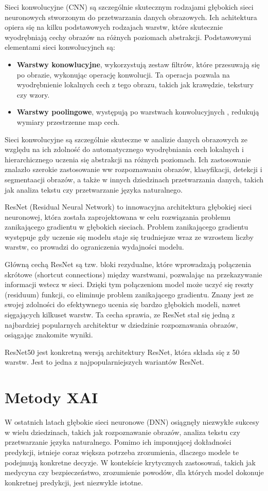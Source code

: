 Sieci konwolucyjne (CNN) są szczególnie skutecznym rodzajami głębokich sieci neuronowych stworzonym do przetwarzania danych obrazowych.
Ich achitektura opiera się na kilku podstawowych rodzajach warstw, które skutecznie wyodrębniają cechy obrazów na różnych poziomach abstrakcji.
Podstawowymi elementami sieci konwolucyjnch są:
\begin{itemize}
  \item \textbf{Warstwy konowlucyjne}, wykorzystują zestaw filtrów, które przesuwają się po obrazie, wykonując operację konwolucji.
    Ta operacja pozwala na wyodrębnienie lokalnych cech z tego obrazu, takich jak krawędzie, tekstury czy wzory.
  \item \textbf{Warstwy poolingowe}, występują po warstwach konwolucyjnych , redukują wymiary przestrzenne map cech.
\end{itemize}
Sieci konwolucyjne są szczególnie skuteczne w analizie danych obrazowych ze względu na ich zdolność do automatycznego wyodrębniania cech lokalnych i hierarchicznego uczenia się abstrakcji na różnych poziomach.
Ich zastosowanie znalazło szerokie zastosowanie ww rozpoznawaniu obrazów, klasyfikacji, detekcji i segmentaacji obrazów, a także w innych dziedzinach przetwarzania danych, takich jak analiza tekstu czy przetwarzanie języka naturalnego.

ResNet (Residual Neural Network) to innowacyjna architektura głębokiej sieci neuronowej, która została zaprojektowana w celu rozwiązania problemu zanikającego gradientu w głębokich sieciach.
Problem zanikającego gradientu występuje gdy uczenie się modelu staje się trudniejsze wraz ze wzrostem liczby warstw, co prowadzi do ograniczenia wydajności modelu.

Główną cechą ResNet są tzw. bloki rezydualne, które wprowadzają połączenia skrótowe (shortcut connections) między warstwami, pozwalając na przekazywanie informacji wstecz w sieci.
Dzięki tym połączeniom model może uczyć się reszty (residuum) funkcji, co eliminuje problem zanikającego gradientu.
Znany jest ze swojej zdolności do efektywnego ucenia się bardzo głębokich modeli, nawet sięgających kilkuset warstw.
Ta cecha sprawia, ze ResNet stał się jedną z najbardziej popularnych architektur w dziedzinie rozpoznawania obrazów, osiągając znakomite wyniki.

ResNet50 jest konkretną wersją architektury ResNet, która składa się z 50 warstw.
Jest to jedna z najpopularniejszych wariantów ResNet.

\section*{Metody XAI}
W ostatnich latach głębokie sieci neuronowe (DNN) osiągnęły niezwykłe sukcesy w wielu dziedzinach, takich jak rozpoznawanie obrazów, analiza tekstu czy przetwarzanie języka naturalnego.
Pomimo ich imponującej dokładności predykcji, istnieje coraz większa potrzeba zrozumienia, dlaczego modele te podejmują konkretne decyzje.
W kontekście krytycznych zastosowań, takich jak medycyna czy bezpieczeństwo, zrozumienie powodów, dla których model dokonuje konkretnej predykcji, jest niezwykle istotne.

